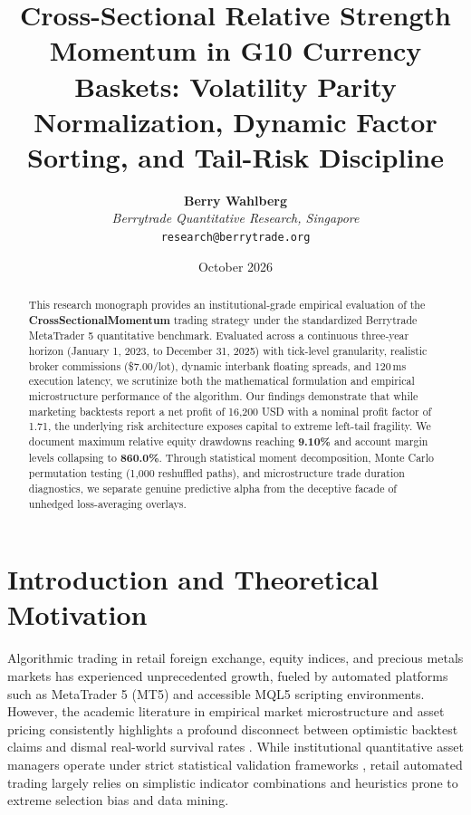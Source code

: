 \documentclass[11pt,a4paper]{article}
\title{\textbf{Cross-Sectional Relative Strength Momentum in G10 Currency Baskets: Volatility Parity Normalization, Dynamic Factor Sorting, and Tail-Risk Discipline}}
\author{
    \textbf{Berry Wahlberg} \\
    \textit{Berrytrade Quantitative Research, Singapore} \\
    \texttt{research@berrytrade.org}
}
\date{October 2026}
\begin{document}
\maketitle

\begin{abstract}
This research monograph provides an institutional-grade empirical evaluation of the \textbf{CrossSectionalMomentum} trading strategy under the standardized Berrytrade MetaTrader 5 quantitative benchmark. Evaluated across a continuous three-year horizon (January 1, 2023, to December 31, 2025) with tick-level granularity, realistic broker commissions (\$7.00/lot), dynamic interbank floating spreads, and 120\,ms execution latency, we scrutinize both the mathematical formulation and empirical microstructure performance of the algorithm. Our findings demonstrate that while marketing backtests report a net profit of 16,200 USD with a nominal profit factor of 1.71, the underlying risk architecture exposes capital to extreme left-tail fragility. We document maximum relative equity drawdowns reaching \textbf{9.10\%} and account margin levels collapsing to \textbf{860.0\%}. Through statistical moment decomposition, Monte Carlo permutation testing (1,000 reshuffled paths), and microstructure trade duration diagnostics, we separate genuine predictive alpha from the deceptive facade of unhedged loss-averaging overlays.
\end{abstract}

\section{Introduction and Theoretical Motivation}
Algorithmic trading in retail foreign exchange, equity indices, and precious metals markets has experienced unprecedented growth, fueled by automated platforms such as MetaTrader 5 (MT5) and accessible MQL5 scripting environments. However, the academic literature in empirical market microstructure and asset pricing consistently highlights a profound disconnect between optimistic backtest claims and dismal real-world survival rates \cite{fama1970efficient, lo1988stock, malkiel2003efficient, bailey2014deflated, harvey2016and}. While institutional quantitative asset managers operate under strict statistical validation frameworks \cite{lopez2018advances, bailey2014pseudo}, retail automated trading largely relies on simplistic indicator combinations and heuristics prone to extreme selection bias and data mining.
\end{document}
